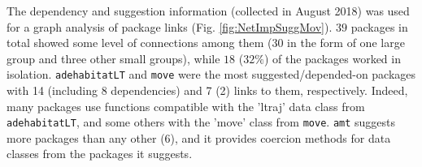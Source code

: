 \documentclass[a4paper,12pt]{article}
\newcommand{\Rpkg}[1]{\texttt{#1}}
\begin{document}
The dependency and suggestion information (collected in August 2018) was used for a graph analysis of package links (Fig. \ref{fig:NetImpSuggMov}). $39$ packages in total showed some level of connections among them ($30$ in the form of one large group and three other small groups), while $18$ ($32\%$) of the packages worked in isolation. \Rpkg{adehabitatLT} and \Rpkg{move} were the most suggested/depended-on packages with 14 (including 8 dependencies) and 7 (2) links to them, respectively. Indeed, many packages use functions compatible with the 'ltraj' data class from \Rpkg{adehabitatLT}, and some others with the 'move' class from \Rpkg{move}. \Rpkg{amt} suggests more packages than any other (6), and it provides coercion methods for data classes from the packages it suggests. 
\end{document}
